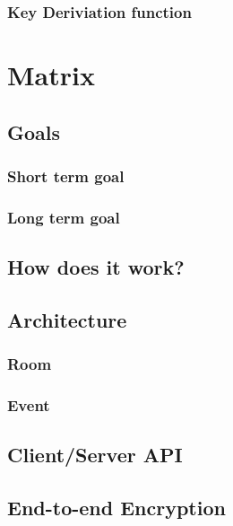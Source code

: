 \subsubsection{Key Deriviation function}

\newpage
\section{Matrix} %

\subsection{Goals}

\subsubsection{Short term goal}

\subsubsection{Long term goal}

\subsection{How does it work?}

\subsection{Architecture}

\subsubsection{Room}

\subsubsection{Event}


\subsection{Client/Server API}

\subsection{End-to-end Encryption}

